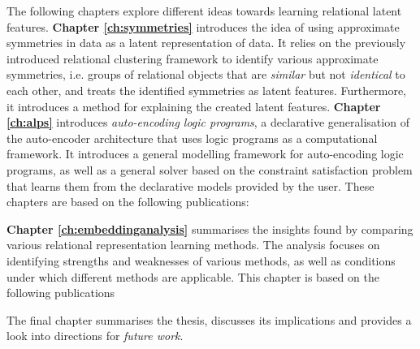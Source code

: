 The following chapters explore different ideas towards learning relational latent features.
\textbf{Chapter \ref{ch:symmetries}} introduces the idea of using approximate symmetries in data as a latent representation of data.
It relies on the previously introduced relational clustering framework to identify various approximate symmetries, i.e. groups of relational objects that are \textit{similar} but not \textit{identical} to each other, and treats the identified symmetries as latent features.
Furthermore, it introduces a method for explaining the created latent features.
\textbf{Chapter \ref{ch:alps}} introduces \textit{auto-encoding logic programs}, a declarative generalisation of the auto-encoder architecture \cite{Hinton504} that uses logic programs as a computational framework.
It introduces a general modelling framework for auto-encoding logic programs, as well as a general solver based on the constraint satisfaction problem that learns them from the declarative models provided by the user.
These chapters are based on the following publications:

\begin{quote}
\end{quote}

\begin{quote}
\end{quote}

\begin{quote}
\end{quote}

\begin{quote}
\end{quote}


\textbf{Chapter \ref{ch:embeddinganalysis}} summarises the insights found by comparing various relational representation learning methods.
The analysis focuses on identifying strengths and weaknesses of various methods, as well as conditions under which different methods are applicable.
This chapter is based on the following publications

\begin{quote}
\end{quote}

\begin{quote}
\end{quote}

\begin{quote}
\end{quote}


The final chapter summarises the thesis, discusses its implications and provides a look into directions for \textit{future work}.







\cleardoublepage

 